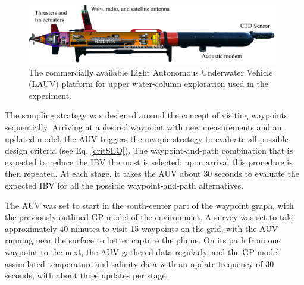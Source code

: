 \documentclass[aoas]{imsart}
\begin{document}
\begin{figure}[!h] 
\centering 
\includegraphics[width=0.98\textwidth]{Figures/harald.jpg}
\caption{The commercially available Light Autonomous Underwater
  Vehicle (LAUV) platform for upper water-column exploration used in
  the experiment.}
\label{fig:lauv}
\end{figure} 

The sampling strategy was designed around the concept of visiting waypoints sequentially. Arriving at a desired waypoint with new measurements and an updated model, the AUV triggers the myopic strategy to evaluate all possible design criteria (see Eq. \eqref{critSEQ}). The waypoint-and-path combination that is expected to reduce the IBV the most is selected; upon arrival this procedure is then repeated. At each stage, it takes the AUV about 30 seconds to evaluate the expected IBV for all the possible waypoint-and-path alternatives.

The AUV was set to start in the south-center part of the waypoint graph, with the previously outlined GP model of the environment. A survey was set to take approximately 40 minutes to visit 15 waypoints on the grid, with the AUV running near the surface to better capture the plume. On its path from one waypoint to the next, the AUV gathered data regularly, and the GP model assimilated temperature and salinity data with an update frequency of 30 seconds, with about three updates per stage.
\end{document}
